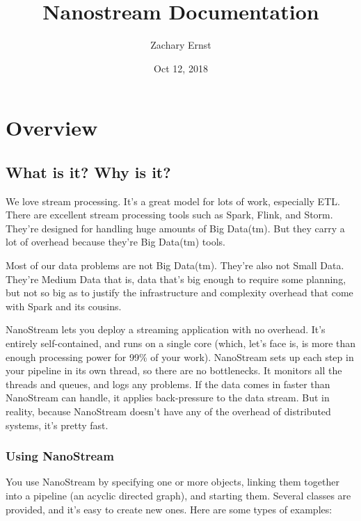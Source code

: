 \documentclass[letterpaper,10pt,english]{sphinxmanual}
\title{Nanostream Documentation}
\date{Oct 12, 2018}
\author{Zachary Ernst}
\begin{document}
\pagestyle{empty}
\maketitle
\pagestyle{plain}
\sphinxtableofcontents
\pagestyle{normal}
\label{\detokenize{index::doc}}



\chapter{Overview}
\label{\detokenize{overview:overview}}\label{\detokenize{overview::doc}}

\section{What is it? Why is it?}
\label{\detokenize{overview:what-is-it-why-is-it}}
We love stream processing. It’s a great model for lots of work,
especially ETL. There are excellent stream processing tools such as
Spark, Flink, and Storm. They’re designed for handling huge amounts of
Big Data(tm). But they carry a lot of overhead because they’re Big
Data(tm) tools.

Most of our data problems are not Big Data(tm). They’re also not Small
Data. They’re Medium Data \textendash{} that is, data that’s big enough to require
some planning, but not so big as to justify the infrastructure and
complexity overhead that come with Spark and its cousins.

NanoStream lets you deploy a streaming application with no overhead.
It’s entirely self-contained, and runs on a single core (which, let’s
face is, is more than enough processing power for 99\% of your work).
NanoStream sets up each step in your pipeline in its own thread, so
there are no bottlenecks. It monitors all the threads and queues, and
logs any problems. If the data comes in faster than NanoStream can
handle, it applies back-pressure to the data stream. But in reality,
because NanoStream doesn’t have any of the overhead of distributed
systems, it’s pretty fast.


\subsection{Using NanoStream}
\label{\detokenize{overview:using-nanostream}}
You use NanoStream by specifying one or more  objects,
linking them together into a pipeline (an acyclic directed graph), and
starting them. Several  classes are provided, and it’s easy
to create new ones. Here are some types of examples:
\end{document}
